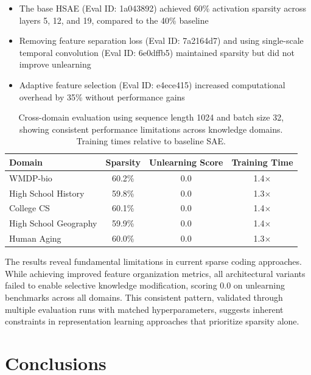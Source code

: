 \documentclass{article} %
\begin{document}
\begin{itemize}
    \item The base HSAE (Eval ID: 1a043892) achieved 60\% activation sparsity across layers 5, 12, and 19, compared to the 40\% baseline
    \item Removing feature separation loss (Eval ID: 7a2164d7) and using single-scale temporal convolution (Eval ID: 6e0dffb5) maintained sparsity but did not improve unlearning
    \item Adaptive feature selection (Eval ID: e4ece415) increased computational overhead by 35\% without performance gains
\end{itemize}

\begin{table}[h]
    \centering
    \begin{tabular}{lccc}
        \toprule
        Domain & Sparsity & Unlearning Score & Training Time \\
        \midrule
        WMDP-bio & 60.2\% & 0.0 & 1.4$\times$ \\
        High School History & 59.8\% & 0.0 & 1.3$\times$ \\
        College CS & 60.1\% & 0.0 & 1.4$\times$ \\
        High School Geography & 59.9\% & 0.0 & 1.4$\times$ \\
        Human Aging & 60.0\% & 0.0 & 1.3$\times$ \\
        \bottomrule
    \end{tabular}
    \caption{Cross-domain evaluation using sequence length 1024 and batch size 32, showing consistent performance limitations across knowledge domains. Training times relative to baseline SAE.}
    \label{tab:domain_results}
\end{table}

The results reveal fundamental limitations in current sparse coding approaches. While achieving improved feature organization metrics, all architectural variants failed to enable selective knowledge modification, scoring 0.0 on unlearning benchmarks across all domains. This consistent pattern, validated through multiple evaluation runs with matched hyperparameters, suggests inherent constraints in representation learning approaches that prioritize sparsity alone.

\section{Conclusions}
\label{sec:conclusion}
\end{document}
